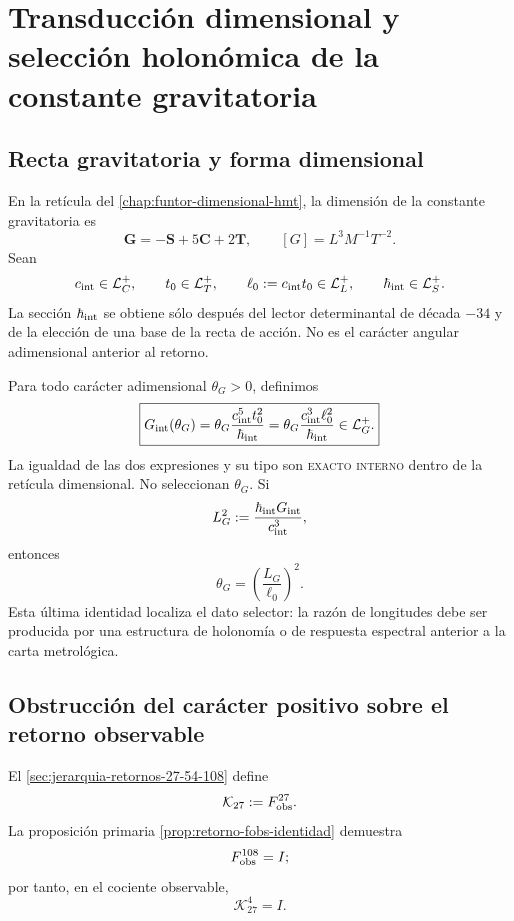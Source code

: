 
\chapter{Transducción dimensional y selección holonómica de la constante
gravitatoria}
\label{chap:transductor-gravitatorio-G}

\section{Recta gravitatoria y forma dimensional}
\label{sec:recta-gravitatoria-interna}

En la retícula del \cref{chap:funtor-dimensional-hmt}, la dimensión de la
constante gravitatoria es
\[
 \mathbf G=-\mathbf S+5\mathbf C+2\mathbf T,
 \qquad
 [G]=L^3M^{-1}T^{-2}.
\]
Sean
\[
 c_{\rm int}\in\mathcal L_C^+,\qquad
 t_0\in\mathcal L_T^+,\qquad
 \ell_0:=c_{\rm int}t_0\in\mathcal L_L^+,
 \qquad
 \hbar_{\rm int}\in\mathcal L_S^+.
\]
La sección \(\hbar_{\rm int}\) se obtiene sólo después del lector
determinantal de década \(-34\) y de la elección de una base de la recta de
acción. No es el carácter angular adimensional anterior al retorno.

Para todo carácter adimensional \(\theta_G>0\), definimos
\[
 \boxed{
 G_{\rm int}(\theta_G)
 =\theta_G
 \frac{c_{\rm int}^{5}t_0^2}{\hbar_{\rm int}}
 =\theta_G
 \frac{c_{\rm int}^{3}\ell_0^2}{\hbar_{\rm int}}
 \in\mathcal L_G^+.}
\]
La igualdad de las dos expresiones y su tipo son
\textsc{exacto interno} dentro de la retícula dimensional. No seleccionan
\(\theta_G\). Si
\[
 L_G^2:=\frac{\hbar_{\rm int}G_{\rm int}}{c_{\rm int}^3},
\]
entonces
\[
 \theta_G=\left(\frac{L_G}{\ell_0}\right)^2.
\]
Esta última identidad localiza el dato selector: la razón de longitudes debe
ser producida por una estructura de holonomía o de respuesta espectral
anterior a la carta metrológica.

\section{Obstrucción del carácter positivo sobre el retorno observable}
\label{sec:selector-holonomia-G}

El \cref{sec:jerarquia-retornos-27-54-108} define
\[
 \mathcal K_{27}:=F_{\rm obs}^{27}.
\]
La proposición primaria \cref{prop:retorno-fobs-identidad} demuestra
\[
 F_{\rm obs}^{108}=I;
\]
por tanto, en el cociente observable,
\[
 \mathcal K_{27}^{4}=I.
\]

